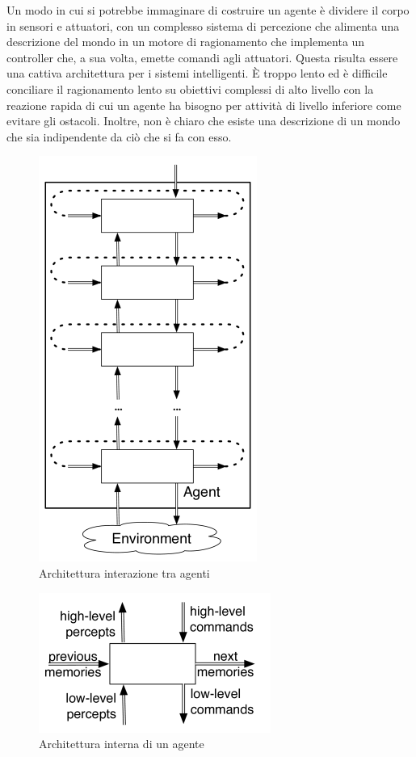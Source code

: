 \documentclass[a4paper]{extarticle}
\begin{document}
Un modo in cui si potrebbe immaginare di costruire un agente è dividere il corpo in sensori e attuatori, con un complesso sistema di percezione che alimenta una descrizione del mondo in un motore di ragionamento che implementa un controller che, a sua volta, emette comandi agli attuatori. Questa risulta essere una cattiva architettura per i sistemi intelligenti. È troppo lento ed è difficile conciliare il ragionamento lento su obiettivi complessi di alto livello con la reazione rapida di cui un agente ha bisogno per attività di livello inferiore come evitare gli ostacoli. Inoltre, non è chiaro che esiste una descrizione di un mondo che sia indipendente da ciò che si fa con esso.
\begin{figure}[h!]
\begin{center}
\includegraphics[scale=.5]{architettura1.png}
\caption{Architettura interazione tra agenti}
\end{center}
\end{figure}
\begin{figure}[h!]
\begin{center}
\includegraphics[scale=.65]{architettura2.png}
\caption{Architettura interna di un agente}
\end{center}
\end{figure}
\end{document}
